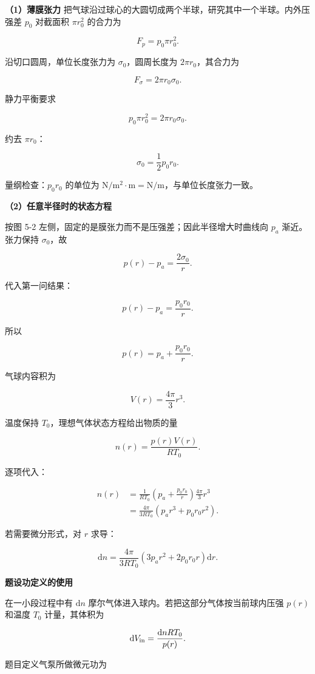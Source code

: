 \documentclass[12pt,a4paper,UTF8]{ctexart}
\begin{document}
\textbf{（1）薄膜张力}
把气球沿过球心的大圆切成两个半球，研究其中一个半球。内外压强差 \(p_0\)
对截面积 \(\pi r_0^2\) 的合力为

\[F_p=p_0\pi r_0^2.\]

沿切口圆周，单位长度张力为 \(\sigma_0\)，圆周长度为
\(2\pi r_0\)，其合力为

\[F_\sigma=2\pi r_0\sigma_0.\]

静力平衡要求

\[p_0\pi r_0^2=2\pi r_0\sigma_0.\]

约去 \(\pi r_0\)：

\[\boxed{\sigma_0=\frac12p_0r_0}.\]

量纲检查：\(p_0r_0\) 的单位为
\(\mathrm{N/m^2}\cdot\mathrm m=\mathrm{N/m}\)，与单位长度张力一致。

\textbf{（2）任意半径时的状态方程}

按图 5-2 左侧，固定的是膜张力而不是压强差；因此半径增大时曲线向 \(p_a\)
渐近。张力保持 \(\sigma_0\)，故

\[p(r)-p_a=\frac{2\sigma_0}{r}.\]

代入第一问结果：

\[p(r)-p_a=\frac{p_0r_0}{r}.\]

所以

\[\boxed{p(r)=p_a+\frac{p_0r_0}{r}}.\]

气球内容积为

\[V(r)=\frac{4\pi}{3}r^3.\]

温度保持 \(T_0\)，理想气体状态方程给出物质的量

\[n(r)=\frac{p(r)V(r)}{RT_0}.\]

逐项代入：

\[\begin{aligned}
n(r)
&=\frac{1}{RT_0}\left(p_a+\frac{p_0r_0}{r}\right)\frac{4\pi}{3}r^3\\
&=\frac{4\pi}{3RT_0}\left(p_ar^3+p_0r_0r^2\right).
\end{aligned}\]

若需要微分形式，对 \(r\) 求导：

\[\mathrm{d}n=\frac{4\pi}{3RT_0}\left(3p_ar^2+2p_0r_0r\right)\mathrm{d}r.\]

\textbf{题设功定义的使用}

在一小段过程中有 \(\mathrm{d}n\)
摩尔气体进入球内。若把这部分气体按当前球内压强 \(p(r)\) 和温度 \(T_0\)
计量，其体积为

\[\mathrm{d}V_{\rm in}=\frac{\mathrm{d}nRT_0}{p(r)}.\]

题目定义气泵所做微元功为
\end{document}
